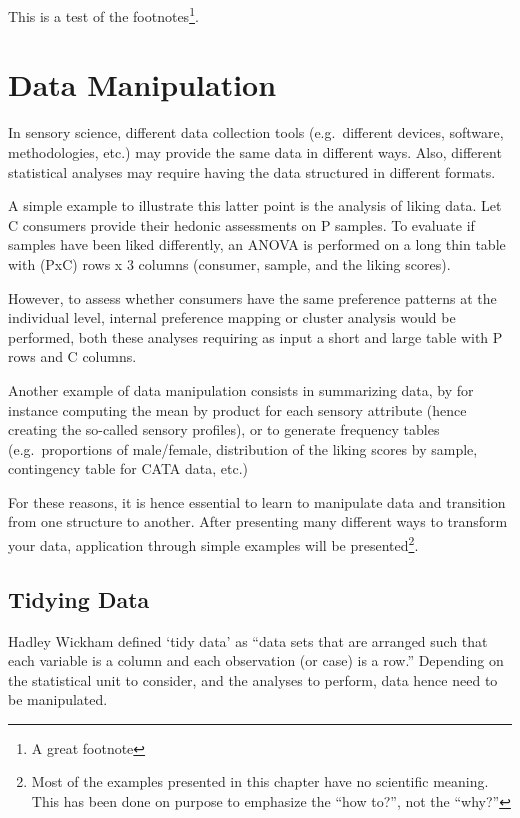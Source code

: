 \documentclass[
]{book}
\begin{document}
This is a test of the footnotes\footnote{A great footnote}.

\hypertarget{data-manip}{%
\chapter{Data Manipulation}\label{data-manip}}

In sensory science, different data collection tools (e.g.~different devices, software, methodologies, etc.) may provide the same data in different ways. Also, different statistical analyses may require having the data structured in different formats.

A simple example to illustrate this latter point is the analysis of liking data.
Let C consumers provide their hedonic assessments on P samples. To evaluate if samples have been liked differently, an ANOVA is performed on a long thin table with (PxC) rows x 3 columns (consumer, sample, and the liking scores).

However, to assess whether consumers have the same preference patterns at the individual level, internal preference mapping or cluster analysis would be performed, both these analyses requiring as input a short and large table with P rows and C columns.

Another example of data manipulation consists in summarizing data, by for instance computing the mean by product for each sensory attribute (hence creating the so-called sensory profiles), or to generate frequency tables (e.g.~proportions of male/female, distribution of the liking scores by sample, contingency table for CATA data, etc.)

For these reasons, it is hence essential to learn to manipulate data and transition from one structure to another. After presenting many different ways to transform your data, application through simple examples will be presented\footnote{Most of the examples presented in this chapter have no scientific meaning. This has been done on purpose to emphasize the ``how to?'', not the ``why?''}.

\hypertarget{tidying-data}{%
\section{Tidying Data}\label{tidying-data}}

Hadley Wickham defined `tidy data' as ``data sets that are arranged such that each variable is a column and each observation (or case) is a row.'' Depending on the statistical unit to consider, and the analyses to perform, data hence need to be manipulated.
\end{document}
